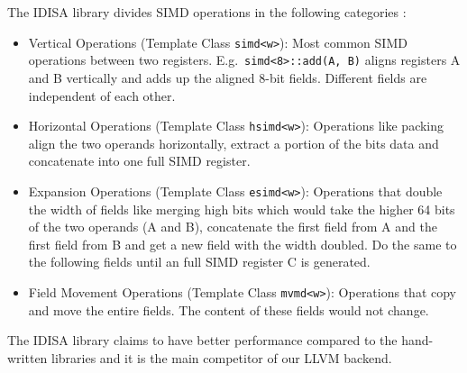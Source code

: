 The IDISA library divides SIMD operations in the following categories \cite{idisa_webpage}:
\begin{itemize}
    \item Vertical Operations (Template Class {\tt simd<w>}): Most common SIMD operations between two registers. E.g.\ {\tt simd<8>::add(A, B)} aligns registers A and B vertically and adds up the aligned 8-bit fields. Different fields are independent of each other.
    \item Horizontal Operations (Template Class {\tt hsimd<w>}): Operations like packing align the two operands horizontally, extract a portion of the bits data and concatenate into one full SIMD register.
    \item Expansion Operations (Template Class {\tt esimd<w>}): Operations that double the width of fields like merging high bits which would take the higher 64 bits of the two operands (A and B), concatenate the first field from A and the first field from B and get a new field with the width doubled. Do the same to the following fields until an full SIMD register C is generated.
    \item Field Movement Operations (Template Class {\tt mvmd<w>}): Operations that copy and move the entire fields. The content of these fields would not change.
\end{itemize}

The IDISA library claims to have better performance compared to the hand-written libraries and it is the main competitor of our LLVM backend.

